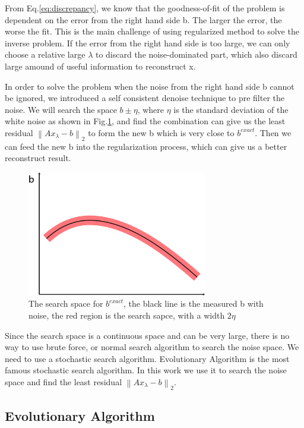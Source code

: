 \documentclass{article}
\begin{document}
From Eq.\ref{eq:discrepancy}, we know that the goodness-of-fit of the problem is
dependent on the error from the right hand side b. The larger the error, the
worse the fit. This is the main challenge of using regularized method to solve
the inverse problem. If the error from the right hand side is too large, we can
only choose a relative large \(\lambda \) to discard the noise-dominated part,
which also discard large amound of useful information to reconstruct x.

In order to solve the problem when the noise from the right hand side b cannot
be ignored, we introduced a self consistent denoise technique to pre filter the
noise. We will search the space \(b \pm \eta \), where \(\eta \) is the standard
deviation of the white noise as shown in Fig.\ref{fig:bsearchspace}, and find
the combination can give us the least residual \({\left\| {A{x_\lambda } - b} \right\|_2}\) to form the new b which
is very close to \({b^{exact}}\).
Then we can feed the new b into the regularization process, which can give us a better reconstruct result.
 \begin{figure}[h!]
  \centering
    \includegraphics[width=0.7\textwidth]{images/bsearchspace/bsearchspace}
  \caption{The search space for \({b^{exact}}\), the black line is the measured
  b with noise, the red region is the search sapce, with a width \(2\eta \)}
  \label{fig:bsearchspace}
\end{figure}
Since the search space is a continuous space and can be very large, there is no
way to use brute force, or normal search algorithm to search the noise space.
We need to use a stochastic search algorithm. Evolutionary Algorithm is the most
famous stochastic search algorithm. In this work we use it to search the noise
space and find the least residual \({\left\| {A{x_\lambda } - b} \right\|_2}\).
\subsection{Evolutionary Algorithm}
\end{document}
